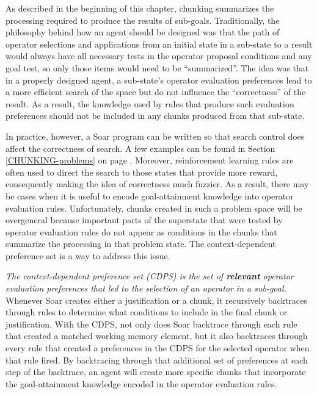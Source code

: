 As described in the beginning of this chapter, chunking summarizes the
processing required to produce the results of sub-goals.  Traditionally, the
philosophy behind how an agent should be designed was
that the path of operator selections and applications from an initial state in a
sub-state to a result would always have all necessary tests in the operator
proposal conditions and any goal test, so only those items would need to be
“summarized”. The idea was that in a properly designed agent, a sub-state's
operator evaluation preferences lead to a more efficient search of the space but
do not influence the “correctness” of the result. As a result, the knowledge
used by rules that produce such evaluation preferences should not be included
in any chunks produced from that sub-state.

In practice, however, a Soar program can be written so that search control does
affect the correctness of search.  A few examples can be found in Section
\ref{CHUNKING-problems} on page \pageref{CHUNKING-problems}.  Moreover,
reinforcement learning rules are often used to direct the search to those states
that provide more reward, consequently making the idea of correctness much
fuzzier.   As a result, there may be cases when it is useful to encode
goal-attainment knowledge into operator evaluation rules. Unfortunately, chunks
created in such a problem space will be overgeneral because important parts of
the superstate that were tested by operator evaluation rules do not appear as
conditions in the chunks that summarize the processing in that problem state.
The context-dependent preference set is a way to address this issue.

\emph{The context-dependent preference set (CDPS) is the set of
\textbf{relevant} operator evaluation preferences that led to the selection of
an operator in a sub-goal.} Whenever Soar creates either a justification or a
chunk, it recursively backtraces through rules to determine what conditions to include in the final chunk or justification.  With the CDPS, not only does Soar backtrace through each rule that created a matched working
memory element, but it also backtraces through every rule that
created a preferences in the CDPS for the selected operator when that rule fired. By
backtracing through that additional set of preferences at each step of the
backtrace, an agent will create more specific chunks that incorporate the
goal-attainment knowledge encoded in the operator evaluation rules.

